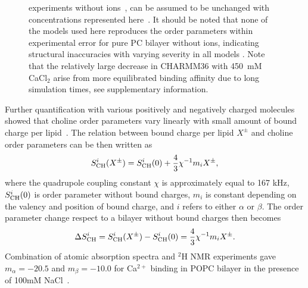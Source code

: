 \documentclass[pre,aps,floatfix,authordate1-4,twocolumn]{revtex4-1}
\begin{document}
\begin{figure}[]
{    experiments without ions~\cite{hong95a,hong95b,gross97}, can be assumed to be unchanged 
    with concentrations represented here~\cite{altenbach84,ollila16}. 
    It should be noted that none of the models used here reproduces the order parameters
    within experimental error for pure PC bilayer without ions, indicating structural inaccuracies with varying severity in all
    models \cite{botan15}. %
    Note that the relatively large decrease in CHARMM36 with 450~mM CaCl$_2$ arise from more equilibrated binding 
    affinity due to long simulation times, see supplementary information.
  }
\end{figure}

Further quantification with various positively 
and negatively charged molecules showed that choline order parameters vary linearly 
with small amount of bound charge per lipid~\cite{altenbach84,altenbach85,seelig87,macdonald87,scherer89,roux90,beschiasvili91,marassi92,rydall92}.
The relation between bound charge per lipid $X^\pm$ and choline order parameters can be then written as~\cite{ferreira16}
\begin{equation}\label{electrometer_eq}
S_{\rm{CH}}^{i}(X^\pm)=S_{\rm{CH}}^{i}(0) + \frac{4}{3}\chi^{-1}m_i X^\pm,
\end{equation}
where the quadrupole coupling constant $\chi$ is approximately equal to 167 kHz,
$S_{\rm{CH}}^{i}(0)$ is order parameter without bound charges, $m_i$
is constant depending on the valency and position of bound charge, and $i$
refers to either $\alpha$ or $\beta$. The order parameter change respect to a 
bilayer without bound charges then becomes
\begin{equation}\label{OPchangeEQ}
\Delta S_{\rm{CH}}^{i}= S_{\rm{CH}}^{i}(X^\pm)-S_{\rm{CH}}^{i}(0) =\frac{4}{3}\chi^{-1}m_i X^\pm.
\end{equation}
Combination of atomic absorption spectra and $^2$H NMR experiments gave $m_\alpha=-20.5$ 
and $m_\beta=-10.0$ for Ca$^{2+}$ binding in POPC bilayer in the presence of 100mM NaCl~\cite{altenbach84}.
\end{document}
